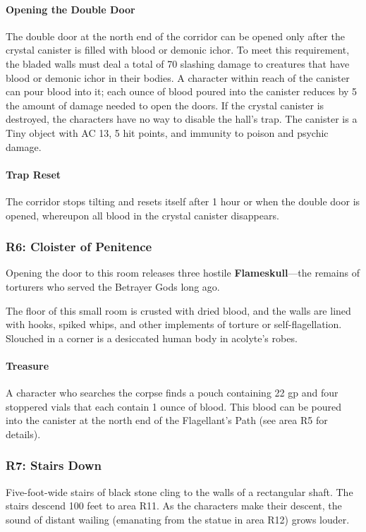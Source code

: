 \documentclass[10pt,a4,twoside,twocolumn,openany,nodeprecatedcode]{dndbook}
\begin{document}
\paragraph{Opening the Double Door}
The double door at the north end of the corridor can be opened only after the crystal canister is filled with blood or demonic ichor. To meet this requirement, the bladed walls must deal a total of 70 slashing damage to creatures that have blood or demonic ichor in their bodies. A character within reach of the canister can pour blood into it; each ounce of blood poured into the canister reduces by 5 the amount of damage needed to open the doors.
If the crystal canister is destroyed, the characters have no way to disable the hall's trap. The canister is a Tiny object with AC 13, 5 hit points, and immunity to poison and psychic damage.
\paragraph{Trap Reset}
The corridor stops tilting and resets itself after 1 hour or when the double door is opened, whereupon all blood in the crystal canister disappears.
\subsubsection{R6: Cloister of Penitence}
Opening the door to this room releases three hostile \textbf{Flameskull}—the remains of torturers who served the Betrayer Gods long ago.
\begin{DndReadAloud}{}
The floor of this small room is crusted with dried blood, and the walls are lined with hooks, spiked whips, and other implements of torture or self-flagellation. Slouched in a corner is a desiccated human body in acolyte's robes.
\end{DndReadAloud}

\paragraph{Treasure}
A character who searches the corpse finds a pouch containing 22 gp and four stoppered vials that each contain 1 ounce of blood. This blood can be poured into the canister at the north end of the Flagellant's Path (see area R5 for details).
\subsubsection{R7: Stairs Down}
Five-foot-wide stairs of black stone cling to the walls of a rectangular shaft. The stairs descend 100 feet to area R11.
As the characters make their descent, the sound of distant wailing (emanating from the statue in area R12) grows louder.
\end{document}
